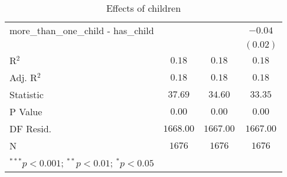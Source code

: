\begin{table}
\begin{center}
\begin{tabular}{l c c c}
more\_than\_one\_child - has\_child     &               &               & $-0.04$       \\
                                        &               &               & $(0.02)$      \\
\hline
R$^2$                                   & $0.18$        & $0.18$        & $0.18$        \\
Adj. R$^2$                              & $0.18$        & $0.18$        & $0.18$        \\
Statistic                               & $37.69$       & $34.60$       & $33.35$       \\
P Value                                 & $0.00$        & $0.00$        & $0.00$        \\
DF Resid.                               & $1668.00$     & $1667.00$     & $1667.00$     \\
N                                       & $1676$        & $1676$        & $1676$        \\
\hline
\multicolumn{4}{l}{\scriptsize{$^{***}p<0.001$; $^{**}p<0.01$; $^{*}p<0.05$}}
\end{tabular}
\caption{Effects of children}
\label{table:coefficients}
\end{center}
\end{table}
